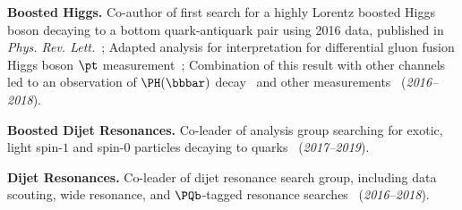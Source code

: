 \documentclass[11pt]{res}
\begin{document}
\begin{resume}
  \textbf{Boosted Higgs.} Co-author of first search for a highly Lorentz boosted Higgs boson decaying to a bottom quark-antiquark pair using 2016 data, published in \emph{Phys. Rev. Lett.}~\cite{Sirunyan:2017dgc}; Adapted analysis for interpretation for differential gluon fusion Higgs boson $\pt$ measurement~\cite{Sirunyan:2018sgc}; Combination of this result with other channels led to an observation of $\PH(\bbbar)$ decay~\cite{Sirunyan:2018kst} and other measurements~\cite{Sirunyan:2018koj} (\textit{2016--2018}).

  \textbf{Boosted Dijet Resonances.} Co-leader of analysis group searching for exotic, light spin-$1$ and spin-$0$ particles decaying to quarks~\cite{Sirunyan:2019vxa,Sirunyan:2019sgo,Sirunyan:2018ikr,Sirunyan:2017nvi} (\textit{2017--2019}).

  \textbf{Dijet Resonances.} Co-leader of dijet resonance search group, including data scouting, wide resonance, and $\PQb$-tagged resonance searches~\cite{Sirunyan:2019pnb,Sirunyan:2019vgj,CMS-PAS-EXO-17-026,Duarte:2018bsd,Sirunyan:2018xlo,Sirunyan:2016iap} (\textit{2016--2018}).


\end{resume}
\end{document}
